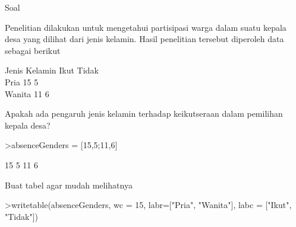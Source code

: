 \documentclass[a4paper,10pt]{article}
\begin{document}
\begin{eulernotebook}
\begin{eulercomment}
\begin{eulercomment}
\begin{eulercomment}
\begin{eulercomment}
\begin{eulercomment}
\begin{eulercomment}
\begin{eulercomment}
\begin{eulercomment}
\begin{eulercomment}
\begin{eulercomment}
\begin{eulercomment}
\begin{eulercomment}
\begin{eulercomment}
\begin{eulercomment}
\begin{eulercomment}
\begin{eulercomment}
\begin{eulercomment}
\begin{eulercomment}
\begin{eulercomment}
\begin{eulercomment}
\begin{eulercomment}
\begin{eulercomment}
\begin{eulercomment}
\begin{eulercomment}
\begin{eulercomment}
\begin{eulercomment}
\begin{eulercomment}
\begin{eulercomment}
\begin{eulercomment}
\begin{eulercomment}
\begin{eulercomment}
\begin{eulercomment}
\begin{eulercomment}
\begin{eulercomment}
\begin{eulercomment}
\begin{eulercomment}
\begin{eulercomment}
\begin{eulercomment}
\begin{eulercomment}
\begin{eulercomment}
\begin{eulercomment}
\begin{eulercomment}
\begin{eulercomment}
\begin{eulercomment}
\begin{eulercomment}
\begin{eulercomment}
\begin{eulercomment}
\begin{eulercomment}
\begin{eulercomment}
\begin{eulercomment}
\begin{eulercomment}
Soal

Penelitian dilakukan untuk mengetahui partisipasi warga dalam suatu
kepala desa yang dilihat dari jenis kelamin. Hasil penelitian tersebut
diperoleh data sebagai berikut

Jenis Kelamin \textbar{} Ikut \textbar{} Tidak\\
Pria          \textbar{} 15   \textbar{} 5\\
Wanita        \textbar{} 11   \textbar{} 6

Apakah ada pengaruh jenis kelamin terhadap keikutseraan dalam
pemilihan kepala desa?
\end{eulercomment}
\begin{eulerprompt}
>absenceGenders = [15,5;11,6]
\end{eulerprompt}
\begin{euleroutput}
         15         5 
         11         6 
\end{euleroutput}
\begin{eulercomment}
Buat tabel agar mudah melihatnya
\end{eulercomment}
\begin{eulerprompt}
>writetable(absenceGenders, wc = 15, labr=["Pria", "Wanita"], labc = ["Ikut", "Tidak"])

\end{eulerprompt}
\end{eulercomment}
\end{eulercomment}
\end{eulercomment}
\end{eulercomment}
\end{eulercomment}
\end{eulercomment}
\end{eulercomment}
\end{eulercomment}
\end{eulercomment}
\end{eulercomment}
\end{eulercomment}
\end{eulercomment}
\end{eulercomment}
\end{eulercomment}
\end{eulercomment}
\end{eulercomment}
\end{eulercomment}
\end{eulercomment}
\end{eulercomment}
\end{eulercomment}
\end{eulercomment}
\end{eulercomment}
\end{eulercomment}
\end{eulercomment}
\end{eulercomment}
\end{eulercomment}
\end{eulercomment}
\end{eulercomment}
\end{eulercomment}
\end{eulercomment}
\end{eulercomment}
\end{eulercomment}
\end{eulercomment}
\end{eulercomment}
\end{eulercomment}
\end{eulercomment}
\end{eulercomment}
\end{eulercomment}
\end{eulercomment}
\end{eulercomment}
\end{eulercomment}
\end{eulercomment}
\end{eulercomment}
\end{eulercomment}
\end{eulercomment}
\end{eulercomment}
\end{eulercomment}
\end{eulercomment}
\end{eulercomment}
\end{eulercomment}
\end{eulernotebook}
\end{document}

